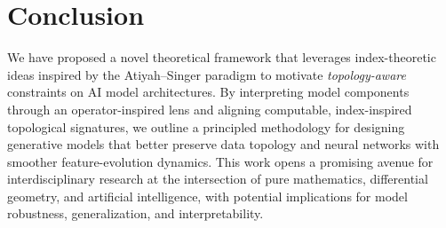 \documentclass[10pt,leqno]{amsart}
\begin{document}
\section{Conclusion}
We have proposed a novel theoretical framework that leverages index-theoretic ideas inspired by the Atiyah--Singer paradigm to motivate \emph{topology-aware} constraints on AI model architectures. By interpreting model components through an operator-inspired lens and aligning computable, index-inspired topological signatures, we outline a principled methodology for designing generative models that better preserve data topology and neural networks with smoother feature-evolution dynamics. This work opens a promising avenue for interdisciplinary research at the intersection of pure mathematics, differential geometry, and artificial intelligence, with potential implications for model robustness, generalization, and interpretability.
\end{document}
